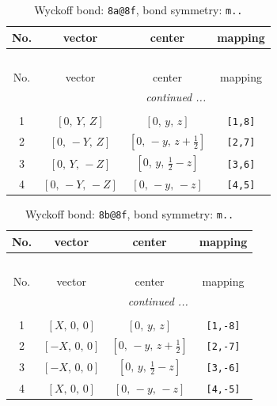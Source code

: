 \documentclass[fleqn,8pt]{jsarticle}
\begin{document}
\begin{longtable}{cccc}
\caption{Wyckoff bond: {\tt 8a@8f}, bond symmetry: {\tt m..}}
 \\
 \hline \hline
No. & vector & center & mapping \\ \hline \endfirsthead

\multicolumn{3}{l}{\tablename\ \thetable{}} \\
 \hline \hline
No. & vector & center & mapping \\ \hline \endhead

 \hline \hline
\multicolumn{3}{r}{\footnotesize\it continued ...} \\ \endfoot

 \hline \hline
\multicolumn{3}{r}{} \\ \endlastfoot

1 & $\left[ 0,\, Y,\, Z \right]$ & $\left[ 0,\, y,\, z \right]$ & {\tt [1,8]} \\ \hline
2 & $\left[ 0,\, - Y,\, Z \right]$ & $\left[ 0,\, - y,\, z + \frac{1}{2} \right]$ & {\tt [2,7]} \\ \hline
3 & $\left[ 0,\, Y,\, - Z \right]$ & $\left[ 0,\, y,\, \frac{1}{2} - z \right]$ & {\tt [3,6]} \\ \hline
4 & $\left[ 0,\, - Y,\, - Z \right]$ & $\left[ 0,\, - y,\, - z \right]$ & {\tt [4,5]} \\
\end{longtable}
\renewcommand{\arraystretch}{1.2}
\begin{longtable}{cccc}
\caption{Wyckoff bond: {\tt 8b@8f}, bond symmetry: {\tt m..}}
 \\
 \hline \hline
No. & vector & center & mapping \\ \hline \endfirsthead

\multicolumn{3}{l}{\tablename\ \thetable{}} \\
 \hline \hline
No. & vector & center & mapping \\ \hline \endhead

 \hline \hline
\multicolumn{3}{r}{\footnotesize\it continued ...} \\ \endfoot

 \hline \hline
\multicolumn{3}{r}{} \\ \endlastfoot

1 & $\left[ X,\, 0,\, 0 \right]$ & $\left[ 0,\, y,\, z \right]$ & {\tt [1,-8]} \\ \hline
2 & $\left[ - X,\, 0,\, 0 \right]$ & $\left[ 0,\, - y,\, z + \frac{1}{2} \right]$ & {\tt [2,-7]} \\ \hline
3 & $\left[ - X,\, 0,\, 0 \right]$ & $\left[ 0,\, y,\, \frac{1}{2} - z \right]$ & {\tt [3,-6]} \\ \hline
4 & $\left[ X,\, 0,\, 0 \right]$ & $\left[ 0,\, - y,\, - z \right]$ & {\tt [4,-5]} \\
\end{longtable}
\end{document}
